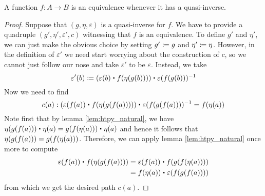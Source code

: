 \begin{thm}
A function $f:A\to B$ is an equivalence whenever it has a quasi-inverse.
\end{thm}

\begin{proof}
Suppose that $(g,\eta,\varepsilon)$ is a quasi-inverse for $f$. We have to provide
a quadruple $(g',\eta',\varepsilon',c)$ witnessing that $f$ is an equivalence. To
define $g'$ and $\eta'$, we can just make the obvious choice by setting $g'
\coloneqq g$ and $\eta'\coloneqq \eta$. However, in the definition of $\varepsilon'$ we
need start worrying about the construction of $c$, so we cannot just follow our nose
and take $\varepsilon'$ to be $\varepsilon$. Instead, we take
\begin{equation*}
\varepsilon'(b) \defeq (\varepsilon(b)\ct \ap{f}{\eta(g(b))})\ct \varepsilon(f(g(b)))^{-1}
\end{equation*}
Now we need to find
\begin{equation*}
c(a):(\varepsilon(f(a))\ct \ap{f}{\eta(g(f(a)))})\ct \varepsilon(f(g(f(a))))^{-1}=\ap{f}{\eta(a)}
\end{equation*}
Note first that by lemma \ref{lem:htpy_natural}, we have 
$\eta(g(f(a)))\ct\eta(a)=\ap{g}{\ap{f}{\eta(a)}}\ct\eta(a)$ and hence it follows
that $\eta(g(f(a)))={g}\!\left({{f}\!\left({\eta(a)}\right)}\right)$. Therefore, we can apply lemma
\ref{lem:htpy_natural} once more to compute
\begin{align*}
\varepsilon(f(a))\ct \ap{f}{\eta(g(f(a)))}
& = \varepsilon(f(a))\ct \ap{f}{\ap{g}{\ap{f}{\eta(a)}}}\\
& = \ap{f}{\eta(a)}\ct\varepsilon(f(g(f(a))))
\end{align*}
from which we get the desired path $c(a)$.
\end{proof}


